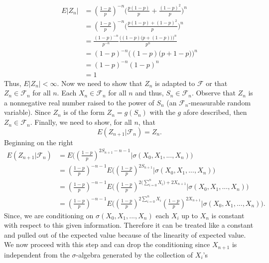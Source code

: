 \documentclass[10pt]{amsart}
\begin{document}
\begin{align*}
E|Z_n| &= \left(\frac{1-p}{p} \right)^{-n} \Bigg(\frac{p(1-p)}{p} + \frac{(1-p)^2}{p}\Bigg)^n \\
	&= \left(\frac{1-p}{p} \right)^{-n} \Bigg(\frac{p(1-p)+ (1-p)^2}{p}\Bigg)^n \\
	&= \frac{(1-p)^{-n}}{p^{-n}} \frac{\bigg((1 - p)\big(p + (1-p)\big)\bigg)^n}{p^n} \\
	&= (1-p)^{-n} \bigg( (1 - p) \big(p + 1 -p \big) \bigg)^n \\
	&= (1-p)^{-n} (1 - p)^n \\
	&= 1
\end{align*}
Thus, $E |Z_n| < \infty$.
Now we need to show that $Z_n$ is adapted to $\mathcal F$ or that $Z_n \in \mathcal F_n$ for all $n$.
Each $X_n \in \mathcal F_n$ for all $n$ and thus, $S_n \in \mathcal F_n$.
Observe that $Z_n$ is a nonnegative real number raised to the power of $S_n$ (an $\mathcal F_n$-measurable random variable).
Since $Z_n$ is of the form $Z_n = g(S_n)$ with the $g$ afore described, then $Z_n \in \mathcal F_n$.
Finally, we need to show, for all $n$, that
$$ E (Z_{n + 1} | \mathcal F_n) = Z_n. $$
Beginning on the right
\begin{align*}
E (Z_{n + 1} | \mathcal F_n) &= E \Bigg(\left(\frac{1-p}{p} \right)^{2S_{n + 1} - n - 1} \Bigg| \sigma(X_0, X_1, ...,  X_n)\Bigg) \\
	&= \left(\frac{1-p}{p} \right)^{- n - 1} E \Bigg(\left(\frac{1-p}{p} \right)^{2S_{n + 1}} \Bigg| \sigma(X_0, X_1, ...,  X_n)\Bigg) \\
	&= \left(\frac{1-p}{p} \right)^{- n - 1} E \Bigg(\left(\frac{1-p}{p} \right)^{2\big(\sum_{i=0}^{n} X_i\big) + 2X_{n + 1}} \Bigg| \sigma(X_0, X_1, ...,  X_n)\Bigg) \\
	&= \left(\frac{1-p}{p} \right)^{- n - 1} E \Bigg(\left(\frac{1-p}{p} \right)^{2\sum_{i=0}^{n} X_i} \left(\frac{1-p}{p} \right)^{2X_{n + 1}} \Bigg| \sigma(X_0, X_1, ...,  X_n)\Bigg).
\end{align*}
Since, we are conditioning on $\sigma(X_0, X_1, ...,  X_n)$ each $X_i$ up to $X_n$ is constant with respect to this given information.
Therefore it can be treated like a constant and pulled out of the expected value because of the linearity of expected value.
We now proceed with this step and can drop the conditioning since $X_{n + 1}$ is independent from the $\sigma$-algebra generated by the collection of $X_i$'s
\end{document}
